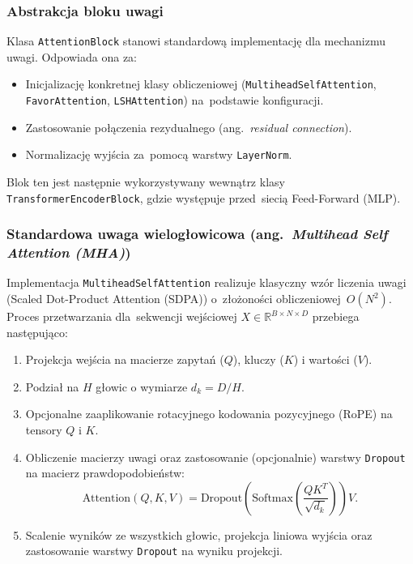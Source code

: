 \documentclass[a4paper,11pt,twoside]{report}
\theoremstyle{definition}
\begin{document}
\subsubsection{Abstrakcja bloku uwagi}
Klasa \texttt{AttentionBlock} stanowi standardową implementację dla mechanizmu uwagi. Odpowiada ona za:
\begin{itemize}
    \item Inicjalizację konkretnej klasy obliczeniowej (\texttt{MultiheadSelfAttention}, \texttt{FavorAttention}, \texttt{LSHAttention}) na~podstawie konfiguracji.
    \item Zastosowanie połączenia rezydualnego (ang.\ \emph{residual connection}).
    \item Normalizację wyjścia za~pomocą warstwy \texttt{LayerNorm}.
\end{itemize}
Blok ten jest następnie wykorzystywany wewnątrz klasy \texttt{TransformerEncoderBlock}, gdzie występuje przed~siecią Feed-Forward (MLP).

\subsubsection{Standardowa uwaga wielogłowicowa (ang.\ \emph{Multihead Self Attention (MHA)})}
Implementacja \texttt{MultiheadSelfAttention} realizuje klasyczny wzór liczenia uwagi (Scaled Dot-Product Attention (SDPA)) o~złożoności obliczeniowej~$O(N^2)$.
Proces przetwarzania dla~sekwencji wejściowej $X \in \mathbb{R}^{B \times N \times D}$ przebiega następująco:
\begin{enumerate}
    \item Projekcja wejścia na macierze zapytań ($Q$), kluczy ($K$) i wartości ($V$).
    \item Podział na $H$ głowic o wymiarze $d_k = D/H$.
    \item Opcjonalne zaaplikowanie rotacyjnego kodowania pozycyjnego (RoPE) na tensory $Q$ i $K$.
    \item Obliczenie macierzy uwagi oraz zastosowanie (opcjonalnie) warstwy \texttt{Dropout} na macierz prawdopodobieństw:
    \begin{equation}
        \text{Attention}(Q, K, V) = \text{Dropout}\left(\text{Softmax}\left(\frac{QK^T}{\sqrt{d_k}}\right)\right)V.
    \end{equation}
    \item Scalenie wyników ze wszystkich głowic, projekcja liniowa wyjścia oraz zastosowanie warstwy \texttt{Dropout} na wyniku projekcji.
\end{enumerate}
\end{document}
